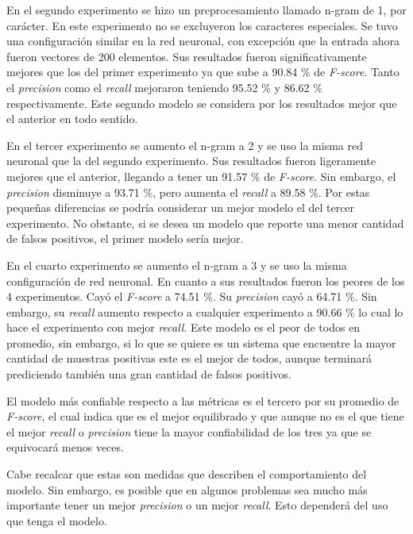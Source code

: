 \par En el segundo experimento se hizo un preprocesamiento llamado n-gram de 1, por carácter. En este experimento no se excluyeron los caracteres especiales. Se tuvo una configuración similar en la red neuronal, con excepción que la entrada ahora fueron vectores de 200 elementos. Sus resultados fueron significativamente mejores que los del primer experimento ya que sube a 90.84 \% de \textit{F-score}. Tanto el \textit{precision} como el \textit{recall} mejoraron teniendo 95.52 \% y 86.62 \% respectivamente. Este segundo modelo se considera por los resultados mejor que el anterior en todo sentido.

\par En el tercer experimento se aumento el n-gram a 2 y se uso la misma red neuronal que la del segundo experimento. Sus resultados fueron ligeramente mejores que el anterior, llegando a tener un 91.57 \% de \textit{F-score}. Sin embargo, el \textit{precision}
disminuye a 93.71 \%, pero aumenta el \textit{recall} a 89.58 \%. Por estas pequeñas diferencias se podría considerar un mejor modelo el del tercer experimento. No obstante, si se desea un modelo que reporte una menor cantidad de falsos positivos, el primer modelo sería mejor.

\par En el cuarto experimento se aumento el n-gram a 3 y se uso la misma configuración de red neuronal. En cuanto a sus resultados fueron los peores de los 4 experimentos. Cayó el \textit{F-score} a 74.51 \%. Su \textit{precision} cayó a 64.71 \%. Sin embargo, su \textit{recall} aumento respecto a cualquier experimento a 90.66 \% lo cual lo hace el experimento con mejor \textit{recall}. Este modelo es el peor de todos en promedio, sin embargo, si lo que se quiere es un sistema que encuentre la mayor cantidad de muestras positivas este es el mejor de todos, aunque terminará prediciendo también una gran cantidad de falsos positivos.

\par El modelo más confiable respecto a las métricas es el tercero por su  promedio de \textit{F-score}, el cual indica que es el mejor equilibrado y que aunque  no es el que tiene el mejor \textit{recall} o \textit{precision} tiene la mayor confiabilidad de los tres ya que se equivocará menos veces.

\par Cabe recalcar que estas son medidas que describen el comportamiento del modelo. Sin embargo, es posible que en algunos problemas sea mucho más importante tener un mejor \textit{precision} o un mejor \textit{recall}. Esto dependerá del uso que tenga el modelo.

